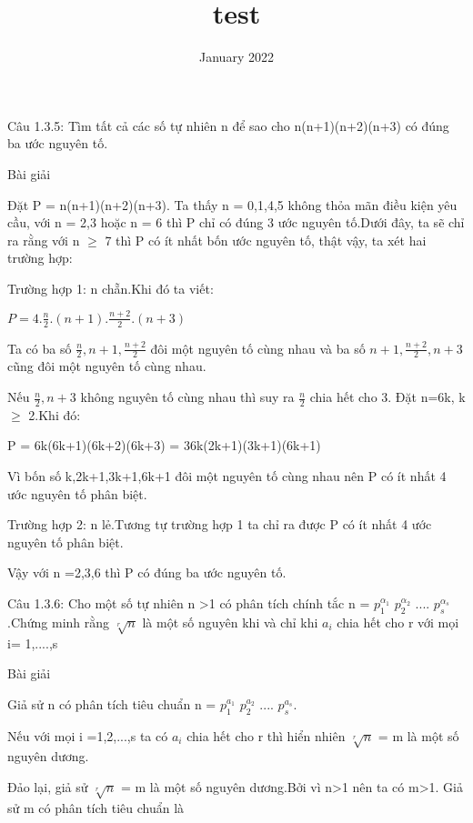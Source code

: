 \documentclass{article}
\title{test}
\date{January 2022}
\begin{document}
	Câu 1.3.5: Tìm tất cả các số tự nhiên n để sao cho n(n+1)(n+2)(n+3) có đúng ba ước nguyên tố.

    \centerline{Bài giải}
    
    Đặt P = n(n+1)(n+2)(n+3). Ta thấy n = 0,1,4,5 không thỏa mãn điều kiện yêu cầu, với n = 2,3 hoặc n = 6 thì P chỉ có đúng 3 ước nguyên tố.Dưới đây, ta sẽ chỉ ra rằng với n $\ge$ 7 thì P có ít nhất bốn ước nguyên tố, thật vậy, ta xét hai trường hợp:
    
   
 \hspace{0.5cm} Trường hợp 1: n chẵn.Khi đó ta viết:
    
    \centerline{$P = 4.\frac{n}{2}.(n+1).\frac{n+2}{2}.(n+3)$}
    
    Ta có ba số $\frac{n}{2},n+1,\frac{n +2}{2}$ đôi một nguyên tố cùng nhau và ba số $n+1, \frac{n+2}{2},n+3$ cũng đôi một nguyên tố cùng nhau.
    
    \hspace{0.5cm} Nếu $\frac{n}{2}, n+3$ không nguyên tố cùng nhau thì suy ra  $\frac{n}{2}$ chia hết cho 3. Đặt n=6k, k $\ge$ 2.Khi đó:
    
    \hspace{1.5cm} P = 6k(6k+1)(6k+2)(6k+3) = 36k(2k+1)(3k+1)(6k+1)
    
   Vì bốn số k,2k+1,3k+1,6k+1 đôi một nguyên tố cùng nhau nên P có ít nhất 4 ước nguyên tố phân biệt.
   
   \hspace{0.5cm} Trường hợp 2: n lẻ.Tương tự trường hợp 1 ta chỉ ra được P có ít nhất 4 ước nguyên tố phân biệt.
   
   \hspace{0.5cm} Vậy với n =2,3,6 thì P có  đúng ba ước nguyên tố.
   
   
   Câu 1.3.6: Cho một số tự nhiên n  >1 có phân tích chính tắc n = $p^{\alpha_{1}}_{1}$  $p^{\alpha_{2}}_{2}$ ....  $p^{\alpha_{s}}_{s}$ .Chứng minh rằng $\sqrt[r]{n}$ là một số nguyên khi và chỉ khi $a_{i}$ chia hết cho r với mọi i= 1,....,s 
   
       \centerline{Bài giải}
      Giả sử n có phân tích tiêu chuẩn n = $p^{a_{1}}_{1}$ $p^{a_{2}}_{2}$ ....  $p^{a_{s}}_{s}$.
      
      Nếu với mọi i =1,2,...,s ta có $a_{i}$ chia hết cho r thì hiển nhiên $\sqrt[r]{n}$ = m là một số nguyên dương.
      
      Đảo lại, giả sử $\sqrt[r]{n}$ = m là một số nguyên dương.Bởi vì n>1 nên ta có m>1. Giả sử m có phân tích tiêu chuẩn là 
      
\end{document}
